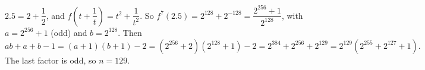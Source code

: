 $2.5=2+\dfrac12$, and $f\!\left(t+\dfrac1t\right)=t^2+\dfrac1{t^2}$. So $f^7(2.5)=2^{128}+2^{-128}=\dfrac{2^{256}+1}{2^{128}}$, with $a=2^{256}+1$ (odd) and $b=2^{128}$. Then
\[ab+a+b-1=(a+1)(b+1)-2=(2^{256}+2)(2^{128}+1)-2=2^{384}+2^{256}+2^{129}=2^{129}(2^{255}+2^{127}+1).\]
The last factor is odd, so $n=\boxed{129}$.
